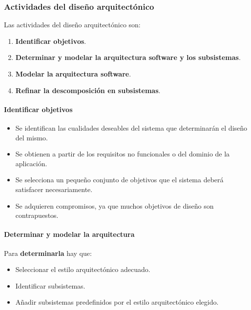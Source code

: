 \documentclass[12pt,spanish]{article}
\begin{document}
\subsubsection{Actividades del diseño arquitectónico}

Las actividades del diseño arquitectónico son:

\begin{enumerate}
	\item \textbf{Identificar objetivos}.
	\item \textbf{Determinar y modelar la arquitectura software y los subsistemas}.
	\item \textbf{Modelar la arquitectura software}.
	\item \textbf{Refinar la descomposición en subsistemas}.
\end{enumerate}

\paragraph{Identificar objetivos\\}

\begin{itemize}
	\item Se identifican las cualidades deseables del sistema que determinarán el diseño del mismo.
	\item Se obtienen a partir de los requisitos no funcionales o del dominio de la aplicación.
	\item Se selecciona un pequeño conjunto de objetivos que el sistema deberá satisfacer necesariamente.
	\item Se adquieren compromisos, ya que muchos objetivos de diseño son contrapuestos.
\end{itemize}

\paragraph{Determinar y modelar la arquitectura\\}

Para \textbf{determinarla} hay que:

\begin{itemize}
	\item Seleccionar el estilo arquitectónico adecuado.
	\item Identificar subsistemas.
	\item Añadir subsistemas predefinidos por el estilo arquitectónico elegido.
\end{itemize}
\end{document}

